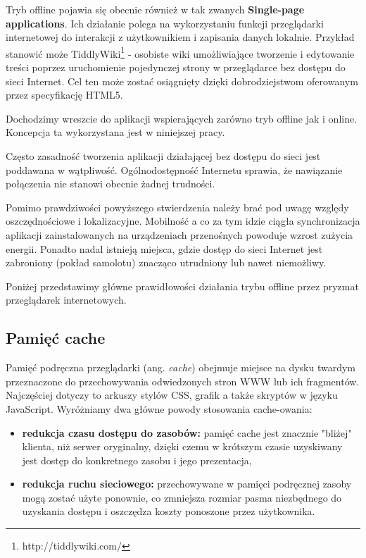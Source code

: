 Tryb offline pojawia się obecnie również w tak zwanych \textbf{Single-page applications}. Ich działanie polega na wykorzystaniu funkcji przeglądarki internetowej do interakcji z użytkownikiem i zapisania danych lokalnie. Przykład stanowić może TiddlyWiki\footnote{http://tiddlywiki.com/} - osobiste wiki umożliwiające tworzenie i edytowanie treści poprzez uruchomienie pojedynczej strony w przeglądarce bez dostępu do sieci Internet. Cel ten może zostać osiągnięty dzięki dobrodziejstwom oferowanym przez specyfikację HTML5.

Dochodzimy wreszcie do aplikacji wspierających zarówno tryb offline jak i online. Koncepcja ta wykorzystana jest w niniejszej pracy.

Często zasadność tworzenia aplikacji działającej bez dostępu do sieci jest poddawana w wątpliwość. Ogólnodostępność Internetu sprawia, że nawiązanie połączenia nie stanowi obecnie żadnej trudności.

Pomimo prawdziwości powyższego stwierdzenia należy brać pod uwagę względy oszczędnościowe i lokalizacyjne. Mobilność a co za tym idzie ciągła synchronizacja aplikacji zainstalowanych na urządzeniach przenośnych powoduje wzrost zużycia energii. Ponadto nadal istnieją miejsca, gdzie dostęp do sieci Internet jest zabroniony (pokład samolotu) znacząco utrudniony lub nawet niemożliwy.

Poniżej przedstawimy główne prawidłowości działania trybu offline przez pryzmat przeglądarek internetowych.

\subsection{Pamięć cache}
\label{sec:pamiecCache}

Pamięć podręczna przeglądarki\cite{pamiecPodreczna} (ang. \emph{cache}) obejmuje miejsce na dysku twardym przeznaczone do przechowywania odwiedzonych stron WWW lub ich fragmentów. Najczęściej dotyczy to arkuszy stylów CSS, grafik a także skryptów w języku JavaScript. Wyróżniamy dwa główne powody stosowania cache-owania:

\begin{itemize}
\item \textbf{redukcja czasu dostępu do zasobów:} pamięć cache jest znacznie "bliżej" klienta, niż serwer oryginalny, dzięki czemu w krótszym czasie uzyskiwany jest dostęp do konkretnego zasobu i jego prezentacja,
\item \textbf{redukcja ruchu sieciowego:} przechowywane w pamięci podręcznej zasoby mogą zostać użyte ponownie, co zmniejsza rozmiar pasma niezbędnego do uzyskania dostępu i oszczędza koszty ponoszone przez użytkownika.
\end{itemize}

